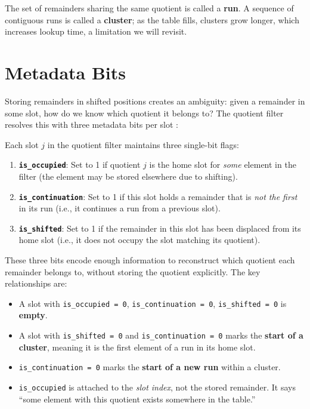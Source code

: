 The set of remainders sharing the same quotient is called a \textbf{run}. 
A sequence of contiguous runs is called a \textbf{cluster}; as the table 
fills, clusters grow longer, which increases lookup time, a limitation 
we will revisit.


\section{Metadata Bits}

Storing remainders in shifted positions creates an ambiguity: given a 
remainder in some slot, how do we know which quotient it belongs to? The 
quotient filter resolves this with three metadata bits per slot 
\cite{quotient}:

\begin{definitionbox}
Each slot $j$ in the quotient filter maintains three single-bit flags:
\begin{enumerate}
  \item \textbf{\texttt{is\_occupied}}: Set to 1 if quotient $j$ is the 
        home slot for \emph{some} element in the filter (the element may 
        be stored elsewhere due to shifting).
  \item \textbf{\texttt{is\_continuation}}: Set to 1 if this slot holds 
        a remainder that is \emph{not the first} in its run (i.e., it 
        continues a run from a previous slot).
  \item \textbf{\texttt{is\_shifted}}: Set to 1 if the remainder in this 
        slot has been displaced from its home slot (i.e., it does not 
        occupy the slot matching its quotient).
\end{enumerate}
\end{definitionbox}

These three bits encode enough information to reconstruct which quotient 
each remainder belongs to, without storing the quotient explicitly. The 
key relationships are:

\begin{itemize}
  \item A slot with \texttt{is\_occupied = 0}, \texttt{is\_continuation = 0}, 
        \texttt{is\_shifted = 0} is \textbf{empty}.
  \item A slot with \texttt{is\_shifted = 0} and 
        \texttt{is\_continuation = 0} marks the \textbf{start of a 
        cluster}, meaning it is the first element of a run in its home slot.
  \item \texttt{is\_continuation = 0} marks the \textbf{start of a new 
        run} within a cluster.
  \item \texttt{is\_occupied} is attached to the \emph{slot index}, not 
        the stored remainder. It says ``some element with this quotient 
        exists somewhere in the table.''
\end{itemize}

